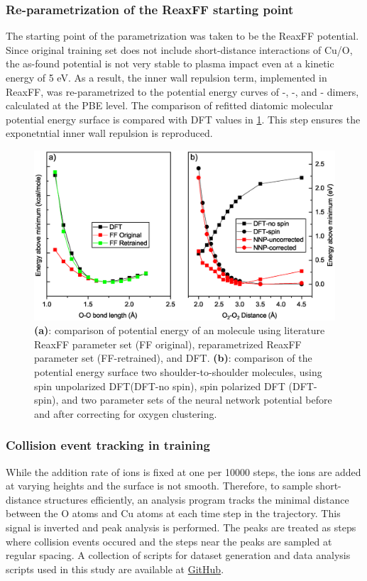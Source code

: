 \documentclass[manuscript=cmatex]{achemso}
\begin{document}
\subsubsection{Re-parametrization of the ReaxFF starting point}
The starting point of the parametrization was taken to be the ReaxFF potential. Since original training set does not include short-distance interactions of Cu/O, the as-found potential is not very stable to plasma impact even at a kinetic energy of 5 eV. As a result, the inner wall repulsion term, implemented in ReaxFF, was re-parametrized to the potential energy curves of -, -, and - dimers, calculated at the PBE level. The comparison of refitted  diatomic molecular potential energy surface is compared with DFT values in \cref{fig:o4}. This step ensures the exponetntial inner wall repulsion is reproduced. 
\begin{figure}[h]
  \centering
  \includegraphics[width=\textwidth]{o2o4}
  \caption[PES of - interaction using DFT and NNP]{\textbf{(a)}: comparison of potential energy of an  molecule using literature ReaxFF parameter set (FF original), reparametrized ReaxFF parameter set (FF-retrained), and DFT. \textbf{(b)}: comparison of the potential energy surface two shoulder-to-shoulder  molecules, using spin unpolarized DFT(DFT-no spin), spin polarized DFT (DFT-spin), and two parameter sets of the neural network potential before and after correcting for oxygen clustering.}
  \label{fig:o4}
\end{figure}
\subsubsection{Collision event tracking in training}
While the addition rate of ions is fixed at one per 10000 steps, the ions are added at varying heights and the surface is not smooth. Therefore, to sample short-distance structures efficiently, an analysis program tracks the minimal distance between the O atoms and Cu atoms at each time step in the trajectory. This signal is inverted and peak analysis is performed. The peaks are treated as steps where collision events occured and the steps near the peaks are sampled at regular spacing. A collection of scripts for dataset generation and data analysis scripts used in this study are available at \href{http://github.com/xyttyxy/ale_scripts}{GitHub}.
\end{document}
